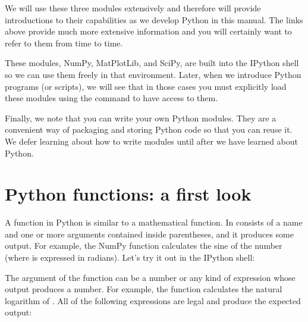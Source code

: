 \documentclass[letterpaper,10pt,english]{sphinxmanual}
\begin{document}
\sphinxAtStartPar
We will use these three modules extensively and therefore will provide introductions to their capabilities as we develop Python in this manual.  The links above provide much more extensive information and you will certainly want to refer to them from time to time.

\sphinxAtStartPar
These modules, NumPy, MatPlotLib, and SciPy, are built into the IPython shell so we can use them freely in that environment.  Later, when we introduce Python programs (or scripts), we will see that in those cases you must explicitly load these modules using the  command to have access to them.

\sphinxAtStartPar
Finally, we note that you can write your own Python modules.  They are a convenient way of packaging and storing Python code so that you can reuse it.  We defer learning about how to write modules until after we have learned about Python.


\section{Python functions: a first look}
\label{\detokenize{chap2/chap2_basics:python-functions-a-first-look}}\label{\detokenize{chap2/chap2_basics:chap2-numpyfuncs}}
\sphinxAtStartPar
A function in Python is similar to a mathematical function.  In consists of a name and one or more arguments contained inside parentheses, and it produces some output.  For example, the NumPy function  calculates the sine of the number  (where  is expressed in radians).  Let’s try it out in the IPython shell:

\begin{sphinxVerbatim}[commandchars=\\\{\}]
\end{sphinxVerbatim}

\sphinxAtStartPar
The argument of the function can be a number or any kind of expression whose output produces a number.  For example, the function  calculates the natural logarithm of .  All of the following expressions are legal and produce the expected output:

\begin{sphinxVerbatim}[commandchars=\\\{\},numbers=left,firstnumber=1,stepnumber=1]


\end{sphinxVerbatim}
\end{document}
